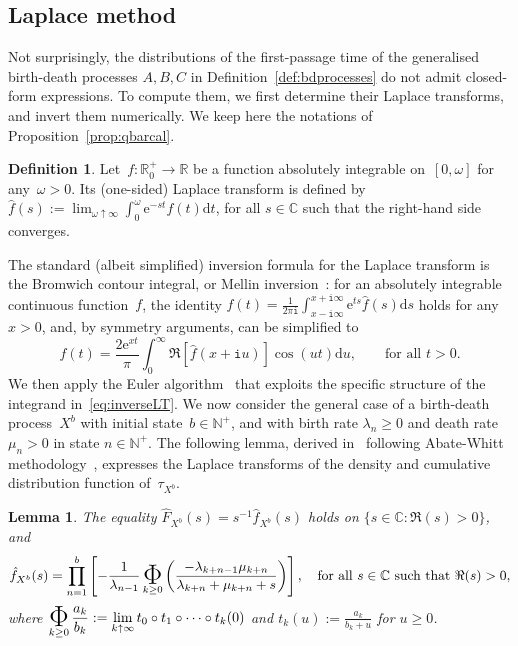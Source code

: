 \documentclass{amsart}[11pt]
\numberwithin{equation}{section}
\newtheorem{lemma}[theorem]{Lemma}
\theoremstyle{definition}
\newtheorem{definition}[theorem]{Definition}
\newcommand{\I}{\mathtt{i}}
\newcommand{\RR}{\mathbb{R}}
\newcommand{\NN}{\mathbb{N}}
\newcommand{\D}{\mathrm{d}}
\newcommand{\CC}{\mathbb{C}}
\newcommand{\E}{\mathrm{e}}
\DeclareMathOperator*{\foo}{\text{\raisebox{-0.7ex}{\huge $\Phi$}}}
\begin{document}
\subsection{Laplace method}\label{sec:queuedistribution}
Not surprisingly, the distributions of the first-passage time of the generalised birth-death processes 
$A, B, C$ in Definition~\ref{def:bdprocesses}
do not admit closed-form expressions.
To compute them, we first determine their Laplace transforms, and invert them numerically.
We keep here the notations of Proposition~\ref{prop:qbarcal}.
\begin{definition}
Let~$f: \RR^+_0 \to \RR$ be a function absolutely integrable on~$[0, \omega]$ for any~$\omega>0$.
Its (one-sided) Laplace transform is defined by
$\hat{f}(s) := \displaystyle\lim_{\omega\uparrow\infty}\int_0^{\omega}\E^{-st}f(t)\D t$,
for all $s\in\CC$ such that the right-hand side converges.
\end{definition}
The standard (albeit simplified) inversion formula for the Laplace transform is the Bromwich contour integral, or Mellin inversion~\cite[Chapter 1]{abate2000introduction}:
for an absolutely integrable continuous function~$f$, 
the identity 
$f(t) = \frac{1}{2\pi\I}\int_{x -\I\infty}^{x + \I\infty}\E^{ts}\hat{f}(s)\D s$
holds for any~$x>0$, and, by symmetry arguments, can be simplified to
\begin{equation}\label{eq:inverseLT}
f(t) =\frac{2\E^{xt}}{\pi}\int_0^{\infty} \Re\left[\hat{f}(x+\I u)\right]\cos(ut)\D u,
\qquad\text{for all }t>0.
\end{equation}
We then apply the Euler algorithm~\cite[Section 1]{abate1995numerical}
that exploits the specific structure of the integrand in~\eqref{eq:inverseLT}.
We now consider the general case of a birth-death process~$X^b$
with initial state~$b\in\NN^+$,
and
with birth rate $\lambda_n\geq0$ and death rate $\mu_n>0$ in state $n \in\NN^+$.
The following lemma, derived in~\cite[Equation (14)]{cont2010stochastic} following Abate-Whitt methodology~\cite[Section 4]{abate1999Computing}, 
expresses the Laplace transforms of the density and cumulative distribution function of~$\tau_{X^b}$.
\begin{lemma}\label{lem:LaplaceMethodf}
The equality $\hat{F}_{X^b}(s) = s^{-1}\hat{f}_{X^b}(s)$ holds on $\{s\in\CC: \Re(s)>0\}$, 
and 
\begin{equation}\label{eq:LTpdfcf}
\hat{f}_{X^b}(s) = \prod_{n=1}^b\left[-\frac{1}{\lambda_{n-1}}\foo_{k\geq 0}
\left(\frac{-\lambda_{k+n-1}\mu_{k+n}}{\lambda_{k+n} + \mu_{k+n} +s}\right)\right],
\quad\text{for all }s \in \CC \text{ such that }\Re(s)>0,
\end{equation}
where
$\displaystyle
\foo_{k\geq 0}\frac{a_k}{b_k} := \lim_{k\uparrow\infty}t_0\circ t_1\circ\dots\circ t_k(0)$
and 
$\displaystyle
t_k(u) := \frac{a_k}{b_k + u}$ for $u\geq 0$.
\end{lemma}
\end{document}
